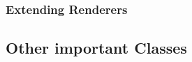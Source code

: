 \paragraph{}


\subsubsection{Extending Renderers}
\paragraph{}



\subsection{Other important Classes}
\paragraph{}

